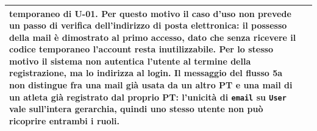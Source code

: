 \documentclass[../../../../SoftwareRequirementsSpecification.tex]{subfiles}
\begin{document}
\begin{tabularx}{\textwidth}{|l|X|}
{    temporaneo di U-01. Per questo motivo il caso d'uso non prevede
    un passo di verifica dell'indirizzo di posta elettronica: il
    possesso della mail è dimostrato al primo accesso, dato che senza
    ricevere il codice temporaneo l'account resta inutilizzabile. Per
    lo stesso motivo il sistema non autentica l'utente al termine
    della registrazione, ma lo indirizza al login. \newline
    Il messaggio del flusso 5a non distingue fra una mail già usata
    da un altro PT e una mail di un atleta già registrato dal proprio
    PT: l'unicità di \texttt{email} su \texttt{User} vale sull'intera
    gerarchia, quindi uno stesso utente non può ricoprire entrambi i
    ruoli.
  } \\ \hline
\end{tabularx}
\end{document}
